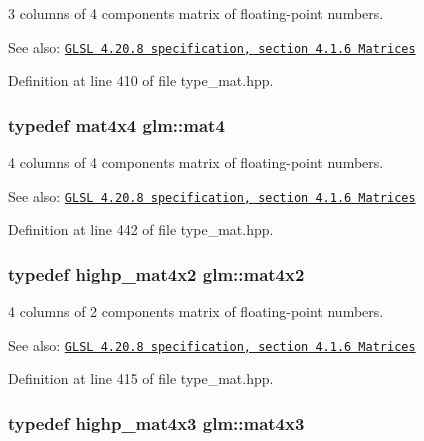 3 columns of 4 components matrix of floating-point numbers.

\begin{Desc}
\item[See also:]\href{http://www.opengl.org/registry/doc/GLSLangSpec.4.20.8.pdf}{\tt GLSL 4.20.8 specification, section 4.1.6 Matrices} \end{Desc}


Definition at line 410 of file type\_\-mat.hpp.\hypertarget{group__core__types_g7dcd2365c2e368e6af5b7adeb6a9c8df}{
\subsubsection[mat4]{\setlength{\rightskip}{0pt plus 5cm}typedef mat4x4 {\bf glm::mat4}}}
\label{group__core__types_g7dcd2365c2e368e6af5b7adeb6a9c8df}


4 columns of 4 components matrix of floating-point numbers.

\begin{Desc}
\item[See also:]\href{http://www.opengl.org/registry/doc/GLSLangSpec.4.20.8.pdf}{\tt GLSL 4.20.8 specification, section 4.1.6 Matrices} \end{Desc}


Definition at line 442 of file type\_\-mat.hpp.\hypertarget{group__core__types_g72cf8ec4f4cda85943f4683531e421bc}{
\subsubsection[mat4x2]{\setlength{\rightskip}{0pt plus 5cm}typedef highp\_\-mat4x2 {\bf glm::mat4x2}}}
\label{group__core__types_g72cf8ec4f4cda85943f4683531e421bc}


4 columns of 2 components matrix of floating-point numbers.

\begin{Desc}
\item[See also:]\href{http://www.opengl.org/registry/doc/GLSLangSpec.4.20.8.pdf}{\tt GLSL 4.20.8 specification, section 4.1.6 Matrices} \end{Desc}


Definition at line 415 of file type\_\-mat.hpp.\hypertarget{group__core__types_gd3f3f750dcdc74a9037342c5cae55f5e}{
\subsubsection[mat4x3]{\setlength{\rightskip}{0pt plus 5cm}typedef highp\_\-mat4x3 {\bf glm::mat4x3}}}
\label{group__core__types_gd3f3f750dcdc74a9037342c5cae55f5e}


